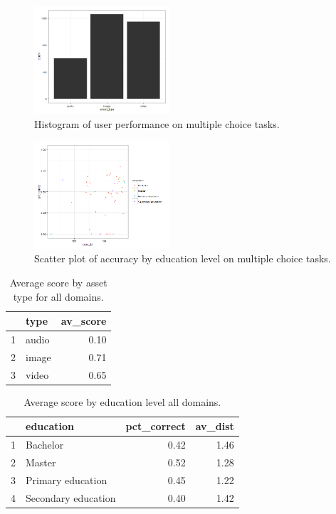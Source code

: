 \documentclass[12pt]{article}
\begin{document}
\begin{figure}[ht!]
\begin{center}
\includegraphics[width=0.45\textwidth]{../../output/demo_analysis/hist_assets.png}
\caption{Histogram of user performance on multiple choice tasks.}
\end{center}	
\end{figure}




\begin{figure}[ht!]
\begin{center}
\includegraphics[width=0.45\textwidth]{../../output/demo_analysis/scatter_edu.png}
\caption{Scatter plot of accuracy by education level on multiple choice tasks.}
\end{center}	
\end{figure}


\begin{table}[ht!]
\centering
\begin{tabular}{rlr}
  \hline
 & type & av\_score \\ 
  \hline
1 & audio & 0.10 \\ 
  2 & image & 0.71 \\ 
  3 & video & 0.65 \\ 
   \hline
\end{tabular}
\caption{Average score by asset type for all domains.} 
\end{table}


\clearpage
\begin{table}[ht!]
\centering
\begin{tabular}{rlrr}
  \hline
 & education & pct\_correct & av\_dist \\ 
  \hline
1 & Bachelor & 0.42 & 1.46 \\ 
  2 & Master & 0.52 & 1.28 \\ 
  3 & Primary education & 0.45 & 1.22 \\ 
  4 & Secondary education & 0.40 & 1.42 \\ 
   \hline
\end{tabular}
\caption{Average score by education level all domains.} 
\end{table}
\end{document}

